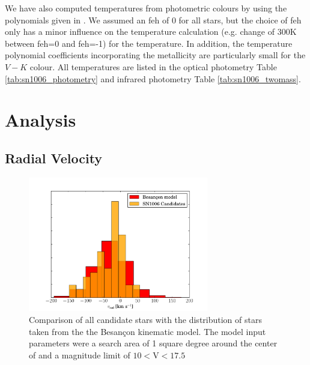 We have also computed temperatures from photometric colours by using the polynomials given in \citet{2010A&A...512A..54C}. We assumed an \gls{feh} of 0 for all stars, but the choice of \gls{feh} only has a minor influence on the temperature calculation (e.g. change of 300K between \gls{feh}=0 and \gls{feh}=-1) for the temperature. In addition, the temperature polynomial coefficients incorporating the metallicity are particularly small for the $V-K$ colour. All temperatures are listed in the optical photometry Table \ref{tab:sn1006_photometry} and infrared photometry Table \ref{tab:sn1006_twomass}.


\section{Analysis}
\label{sec:sn1006_analysis}
\subsection{Radial Velocity}

\begin{figure}[tb] %
   \centering
   \includegraphics[width=0.7\textwidth]{chapter_sn1006/plots/sn1006_vrad_besancon.pdf} 
   \caption{Comparison of all candidate stars with the distribution of stars taken from the the Besan\c{c}on kinematic model. The model input parameters were a search area of 1 square degree around the center of  and a magnitude limit of $10<\textrm{V}<17.5$}
   \label{fig:sn1006_vrad_comp}
\end{figure}


